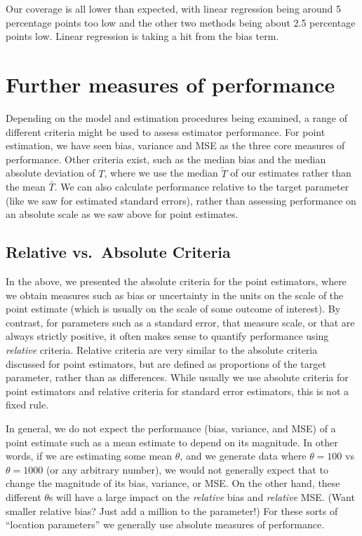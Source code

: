 \documentclass[
]{book}
\begin{document}
Our coverage is all lower than expected, with linear regression being around 5 percentage points too low and the other two methods being about 2.5 percentage points low.
Linear regression is taking a hit from the bias term.

\hypertarget{further-measures-of-performance}{%
\section{Further measures of performance}\label{further-measures-of-performance}}

Depending on the model and estimation procedures being examined, a range of different criteria might be used to assess estimator performance.
For point estimation, we have seen bias, variance and MSE as the three core measures of performance.
Other criteria exist, such as the median bias and the median absolute deviation of \(T\), where we use the median \(\tilde{T}\) of our estimates rather than the mean \(\bar{T}\).
We can also calculate performance relative to the target parameter (like we saw for estimated standard errors), rather than assessing performance on an absolute scale as we saw above for point estimates.

\hypertarget{sec_relative_performance}{%
\subsection{Relative vs.~Absolute Criteria}\label{sec_relative_performance}}

In the above, we presented the absolute criteria for the point estimators, where we obtain measures such as bias or uncertainty in the units on the scale of the point estimate (which is usually on the scale of some outcome of interest).
By contrast, for parameters such as a standard error, that measure scale, or that are always strictly positive, it often makes sense to quantify performance using \emph{relative} criteria.
Relative criteria are very similar to the absolute criteria discussed for point estimators, but are defined as proportions of the target parameter, rather than as differences.
While usually we use absolute criteria for point estimators and relative criteria for standard error estimators, this is not a fixed rule.

In general, we do not expect the performance (bias, variance, and MSE) of a point estimate such as a mean estimate to depend on its magnitude.
In other words, if we are estimating some mean \(\theta\), and we generate data where \(\theta = 100\) vs \(\theta = 1000\) (or any arbitrary number), we would not generally expect that to change the magnitude of its bias, variance, or MSE.
On the other hand, these different \(\theta\)s will have a large impact on the \emph{relative} bias and \emph{relative} MSE.
(Want smaller relative bias? Just add a million to the parameter!)
For these sorts of ``location parameters'' we generally use absolute measures of performance.
\end{document}
